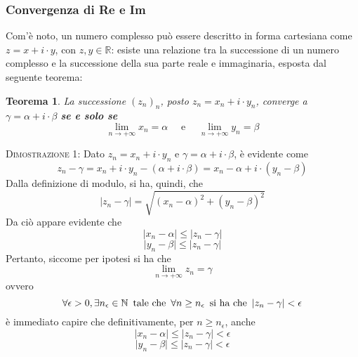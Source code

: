 \documentclass[a4paper]{extarticle}
\newtheorem{theorem}{Teorema}[section]
\begin{document}
\vspace{1em}
\noindent
\subsubsection{Convergenza di Re e Im}
Com'è noto, un numero complesso può essere descritto in forma cartesiana come $z=x+i \cdot y$, con $z,y \in \mathbb{R}$: esiste una relazione tra la successione di un numero complesso e la successione della sua parte reale e immaginaria, esposta dal seguente teorema:

\vspace{1em}
\begin{theorem}
    La successione $(z_n)_n$, posto $z_n=x_n+i \cdot y_n$, converge a $\gamma = \alpha + i \cdot \beta$ \textbf{se e solo se}
    \[\lim_{n \to +\infty} x_n = \alpha \hspace{1em} \text{ e } \hspace{1em} \lim_{n \to + \infty} y_n = \beta\]
\end{theorem}

\vspace{2em}
\noindent
\normalfont \normalsize
\textsc{Dimostrazione 1}: Dato $z_n=x_n+i \cdot y_n$ e $\gamma = \alpha + i \cdot \beta$, è evidente come
\[z_n-\gamma = x_n+i \cdot y_n - (\alpha + i \cdot \beta) = x_n-\alpha + i \cdot (y_n-\beta)\]
Dalla definizione di modulo, si ha, quindi, che
\[\vert z_n - \gamma \vert = \sqrt{(x_n-\alpha)^2+(y_n-\beta)^2}\]
Da ciò appare evidente che
\[\vert x_n - \alpha \vert \leq \vert z_n - \gamma \vert\]
\[\vert y_n - \beta  \vert \leq \vert z_n - \gamma \vert\]
Pertanto, siccome per ipotesi si ha che 
\[\lim_{n \to +\infty} z_n = \gamma\]
ovvero
\[\forall \epsilon > 0, \exists n_\epsilon \in \mathbb{N} \hspace{0.5em} \text{tale che} \hspace{0.5em} \forall n \geq n_\epsilon \hspace{0.5em} \text{si ha che} \hspace{0.5em} \vert z_n - \gamma \vert < \epsilon\]
è immediato capire che definitivamente, per $n \geq n_\epsilon$, anche
\[\vert x_n - \alpha \vert \leq \vert z_n - \gamma \vert < \epsilon\]
\[\vert y_n - \beta  \vert \leq \vert z_n - \gamma \vert < \epsilon\]
\end{document}
